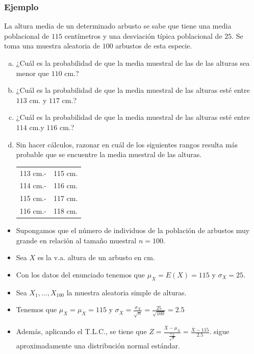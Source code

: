 \begin{frame}
\frametitle{Ejemplo}
    La altura media de  un determinado arbusto se sabe que tiene una media poblacional de $115$ centímetros y una desviación
    típica poblacional de $25$. Se toma una muestra aleatoria de $100$ arbustos de esta especie.
    \begin{enumerate}[a)]
        \item ¿Cuál es la probabilidad de que la media muestral de las
        de las alturas sea menor que $110$ cm.?
        \item ¿Cuál es la probabilidad de que la media muestral de las
        alturas esté entre $113$ cm. y $117$ cm.?
        \item ¿Cuál es la probabilidad de que la media muestral de las
        alturas esté entre $114$ cm.y $116$ cm.?
        \item Sin hacer cálculos, razonar en cuál de los siguientes rangos
        resulta más probable que se encuentre la media muestral de las
        alturas.
        \begin{center}
        \begin{tabular}{ll}
        113 cm.-&115 cm.\\
        114 cm.-&116 cm.\\
        115 cm.-&117 cm.\\
        116 cm.-&118 cm.
            \end{tabular}
            \end{center}
        \end{enumerate}
\end{frame}

\begin{frame}
\begin{itemize}
\item Supongamos que el número de individuos de la población de arbustos muy grande en relación al tamaño
muestral $n=100$.
\item  Sea $X$ es la v.a. altura de un arbusto en cm. 
\item Con los datos del enunciado tenemos que  $\mu_{X}=E(X)=115$ y $\sigma_{X}=25$.
\item  Sea 
$X_{1},\ldots,X_{100}$ la muestra aleatoria simple de alturas.
\item Tenemos que  $\mu_{\overline{X}}=\mu_{X}=115$ y
$\sigma_{\overline{X}}= \frac{\sigma_{X}}{\sqrt{n}}=\frac{25}{\sqrt{100}}=2.5$
\item Además, aplicando el T.L.C.,  se tiene que $Z=\frac{\overline{X}-\mu_{X}}{\frac{\sigma_{X}}{\sqrt{n}}}=
\frac{\overline{X}-115}{2.5}$.
 sigue aproximadamente una distribución normal estándar.
\end{itemize}
\end{frame}

